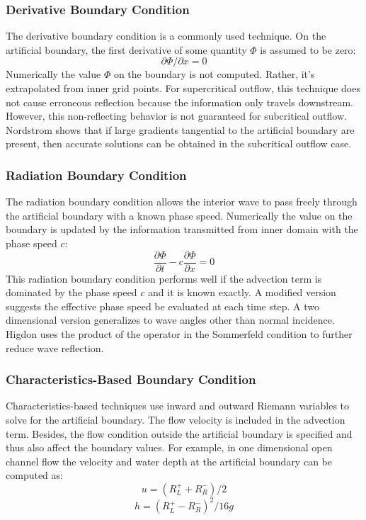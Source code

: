 \subsubsection*{\normalsize{Derivative Boundary Condition} }
The derivative boundary condition is a commonly used technique. On the artificial boundary, the first derivative of some quantity $\Phi$ is assumed to be zero:
\begin{equation}
\partial \Phi /\partial x = 0
\end{equation}
Numerically the value $\Phi$ on the boundary is not computed. Rather, it's extrapolated from inner grid points.
For supercritical outflow, this technique does not cause erroneous reflection because the information only travels downstream. However, this non-reflecting behavior is not guaranteed for subcritical outflow. Nordstrom \cite{Nordstrom1995} shows that if large gradients tangential to the artificial boundary are present, then accurate solutions can be obtained in the subcritical outflow case.

\subsubsection*{\normalsize{Radiation Boundary Condition}}
The radiation boundary condition \cite{Sommerfeld1949} allows the
interior wave to pass freely through the artificial boundary with
a known phase speed.
Numerically the value on the boundary is updated by the information transmitted
from inner domain with the phase speed $c$:
\begin{equation}
\frac{\partial \Phi}{\partial t}-c\frac{\partial \Phi}{\partial x}
= 0
\end{equation}
This radiation boundary condition performs well if the advection term is dominated by the phase speed $c$ and it is known exactly.
A modified version \cite{Orlanski1976} suggests the effective phase speed be evaluated at each time step. A two dimensional version \cite{Engquist1977} generalizes to wave angles other than normal incidence. Higdon \cite{Higdon86} uses the product of the operator in the Sommerfeld condition to further reduce wave reflection.
\subsubsection*{\normalsize{Characteristics-Based Boundary Condition}}
Characteristics-based techniques \cite{Henderson1966} use inward and outward Riemann variables to solve for the artificial boundary. The flow velocity is included in the advection term. Besides, the flow condition outside the artificial boundary is specified and thus also affect the boundary values.
For example, in one dimensional open channel flow the velocity and water depth at the artificial boundary can be computed as:
\begin{equation}
u=(R^+_L + R^-_R)/2
\end{equation}
\begin{equation}
h=(R^+_L - R^-_R)^2/16g
\end{equation}
